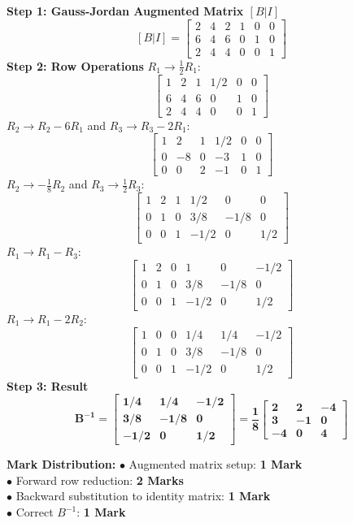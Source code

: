 \begin{solutionbox}
\textbf{Step 1: Gauss-Jordan Augmented Matrix $[B|I]$}
\[
[B|I] = \left[\begin{array}{ccc|ccc}
2 & 4 & 2 & 1 & 0 & 0 \\
6 & 4 & 6 & 0 & 1 & 0 \\
2 & 4 & 4 & 0 & 0 & 1
\end{array}\right]
\]
\textbf{Step 2: Row Operations}
$R_1 \to \frac{1}{2}R_1$:
\[
\left[\begin{array}{ccc|ccc}
1 & 2 & 1 & 1/2 & 0 & 0 \\
6 & 4 & 6 & 0 & 1 & 0 \\
2 & 4 & 4 & 0 & 0 & 1
\end{array}\right]
\]
$R_2 \to R_2 - 6R_1$ and $R_3 \to R_3 - 2R_1$:
\[
\left[\begin{array}{ccc|ccc}
1 & 2 & 1 & 1/2 & 0 & 0 \\
0 & -8 & 0 & -3 & 1 & 0 \\
0 & 0 & 2 & -1 & 0 & 1
\end{array}\right]
\]
$R_2 \to -\frac{1}{8}R_2$ and $R_3 \to \frac{1}{2}R_3$:
\[
\left[\begin{array}{ccc|ccc}
1 & 2 & 1 & 1/2 & 0 & 0 \\
0 & 1 & 0 & 3/8 & -1/8 & 0 \\
0 & 0 & 1 & -1/2 & 0 & 1/2
\end{array}\right]
\]
$R_1 \to R_1 - R_3$:
\[
\left[\begin{array}{ccc|ccc}
1 & 2 & 0 & 1 & 0 & -1/2 \\
0 & 1 & 0 & 3/8 & -1/8 & 0 \\
0 & 0 & 1 & -1/2 & 0 & 1/2
\end{array}\right]
\]
$R_1 \to R_1 - 2R_2$:
\[
\left[\begin{array}{ccc|ccc}
1 & 0 & 0 & 1/4 & 1/4 & -1/2 \\
0 & 1 & 0 & 3/8 & -1/8 & 0 \\
0 & 0 & 1 & -1/2 & 0 & 1/2
\end{array}\right]
\]
\textbf{Step 3: Result}
\[
\mathbf{B^{-1} = \begin{bmatrix} 1/4 & 1/4 & -1/2 \\ 3/8 & -1/8 & 0 \\ -1/2 & 0 & 1/2 \end{bmatrix} = \frac{1}{8}\begin{bmatrix} 2 & 2 & -4 \\ 3 & -1 & 0 \\ -4 & 0 & 4 \end{bmatrix}}
\]

\begin{markingrubric}
\textbf{Mark Distribution:}
$\bullet$ Augmented matrix setup: \textbf{1 Mark}\\
$\bullet$ Forward row reduction: \textbf{2 Marks}\\
$\bullet$ Backward substitution to identity matrix: \textbf{1 Mark}\\
$\bullet$ Correct $B^{-1}$: \textbf{1 Mark}
\end{markingrubric}
\end{solutionbox}

